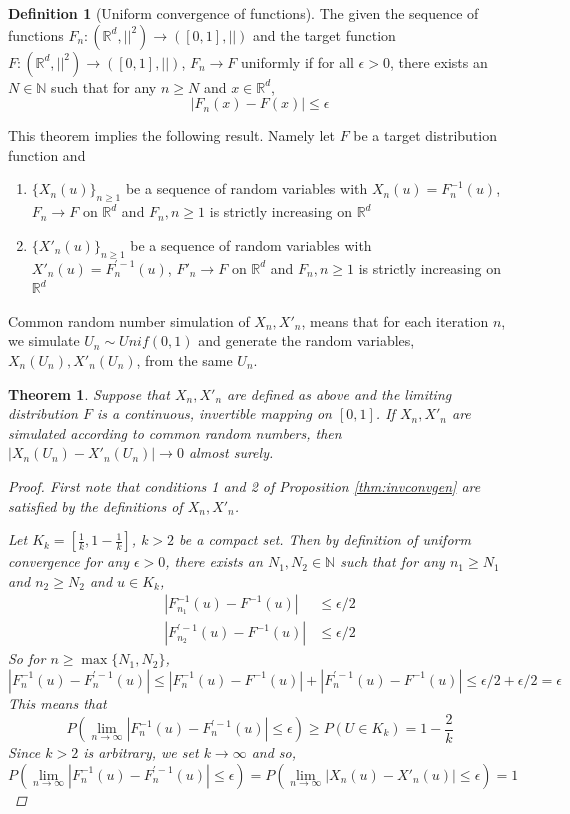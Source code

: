 \documentclass{article}
\theoremstyle{plain}%
\newtheorem{theorem}{Theorem}[section]
\theoremstyle{definition}
\newtheorem{definition}{Definition}[section]
\theoremstyle{remark}
\begin{document}
	\begin{definition}[Uniform convergence of functions]
		The given the sequence of functions $F_{n}:(\mathbb{R}^d,||^2)\to ([0,1],||)$ and the target function $F:(\mathbb{R}^d,||^2)\to ([0,1],||)$,  $F_n\to F$ uniformly if for all $\epsilon >0$, there exists an $N\in\mathbb{N}$ such that for any $n\geq N$ and $x\in \mathbb{R}^d$, 
		$$|F_n(x)-F(x)|\leq \epsilon$$
	\end{definition}
	
	This theorem implies the following result. Namely let $F$ be a target distribution function and 
	\begin{enumerate}
		\item $\{X_n(u)\}_{n\geq 1}$ be a sequence of random variables with $X_n(u)=F^{-1}_n(u)$, $F_n\to F$ on $\mathbb{R}^d$ and $F_n, n\geq 1$ is strictly increasing  on $\mathbb{R}^d$
		\item $\{X'_n(u)\}_{n\geq 1}$ be a sequence of random variables with $X'_n(u)=F^{'-1}_n(u)$, $F'_n\to F$ on $\mathbb{R}^d$ and $F_n, n\geq 1$ is  strictly increasing on $\mathbb{R}^d$
	\end{enumerate}
	
	Common random number simulation of $X_n, X'_n$, means that for each iteration $n$, we simulate $U_n\sim Unif(0,1)$ and generate the random variables, $X_n(U_n), X'_n(U_n)$, from the same $U_n$. 
	
	\begin{theorem}\label{thm:skorohod}
		Suppose that $X_n,X'_n$ are defined as above and the limiting distribution $F$ is a continuous, invertible mapping on $[0,1]$. If $X_n, X'_n$ are simulated according to common random numbers, then  $|X_n(U_n)-X'_n(U_n)|\to 0$ almost surely.
		
		\begin{proof}
			First note that conditions 1 and 2 of Proposition \ref{thm:invconvgen} are satisfied by the definitions of $X_n,X'_n$.
			
			Let $K_k=[\frac{1}{k}, 1-\frac{1}{k}]$, $k>2$ be a compact set. Then by definition of uniform convergence for any $\epsilon >0$, there exists an $N_1,N_2\in\mathbb{N}$ such that for any $n_1\geq N_1$ and $n_2\geq N_2$ and $u\in K_k$, 
			\begin{align*}
				|F^{-1}_{n_1}(u)-F^{-1}(u)|&\leq \epsilon/2\\
				|F^{'-1}_{n_2}(u)-F^{-1}(u)|&\leq \epsilon/2
			\end{align*}
			So for $n\geq \max\{N_1,N_2\}$,
			$$|F^{-1}_{n}(u)-F^{'-1}_{n}(u)|\leq |F^{-1}_{n}(u)-F^{-1}(u)|+|F^{'-1}_{n}(u)-F^{-1}(u)|\leq \epsilon/2+\epsilon/2=\epsilon$$
			This means that 
			$$P(\lim_{n\to\infty} |F^{-1}_n(u)-F^{'-1}_n(u)|\leq \epsilon)\geq P(U\in K_k)=1-\frac{2}{k}$$
			Since $k>2$ is arbitrary, we set $k\to\infty$ and so,
			$$P\left(\lim_{n\to\infty} |F^{-1}_n(u)-F^{'-1}_n(u)|\leq \epsilon\right)=P\left(\lim_{n\to\infty} |X_n(u)-X'_n(u)|\leq \epsilon\right)=1$$
		\end{proof}
	\end{theorem}
	
\end{document}
